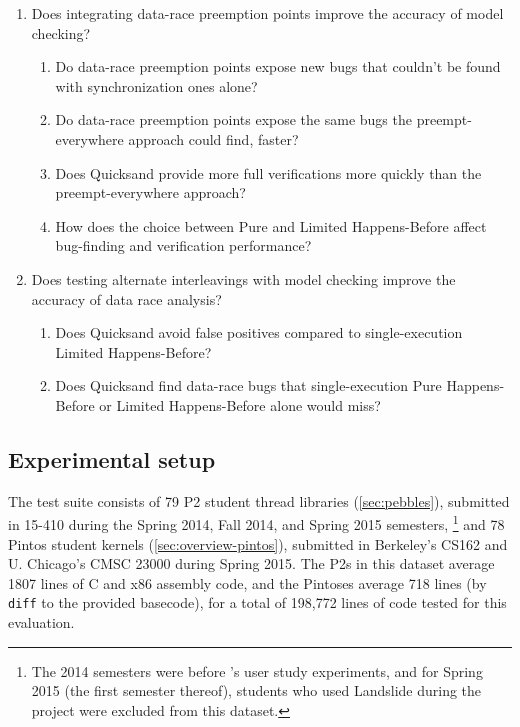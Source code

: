 \begin{enumerate}
	\item Does integrating data-race preemption points improve the accuracy of model checking?
		\begin{enumerate}
			\item Do data-race preemption points expose new bugs that couldn't be found with
				synchronization ones alone?
			\item Do data-race preemption points expose the same bugs
				the preempt-everywhere approach could find, faster?
			\item Does Quicksand provide more full verifications %
				more quickly than the preempt-everywhere approach?
			\item How does the choice between Pure and Limited Happens-Before
				affect bug-finding and verification performance?
		\end{enumerate}
	\item Does testing alternate interleavings with model checking improve the accuracy of data race analysis?
		\begin{enumerate}
			\item Does Quicksand avoid false positives compared to single-execution Limited Happens-Before?
			\item Does Quicksand find data-race bugs that single-execution Pure Happens-Before or Limited Happens-Before alone would miss?
		\end{enumerate}
\end{enumerate}

\subsection{Experimental setup}
\label{sec:quicksand-expt-setup}

The test suite consists of 79 P2 student thread libraries (\cref{sec:pebbles}),
submitted in 15-410 during the Spring 2014, Fall 2014, and Spring 2015 semesters,%
\footnote{The 2014 semesters were before 's user study experiments,
and for Spring 2015 (the first semester thereof),
students who used Landslide during the project were excluded from this dataset.}
and 78 Pintos student kernels (\cref{sec:overview-pintos}),
submitted in Berkeley's CS162 and U. Chicago's CMSC 23000 during Spring 2015.
The P2s in this dataset average 1807 lines of C and x86 assembly code,
and the Pintoses average 718 lines (by {\tt diff} to the provided basecode),
for a total of 198,772 lines of code tested for this evaluation.

